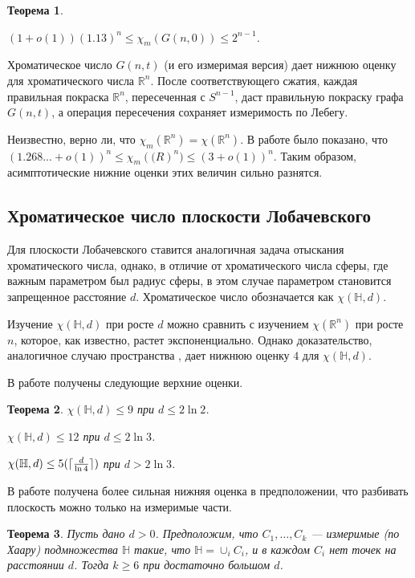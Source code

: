 \documentclass[a4paper,12pt]{article}
\DeclarePairedDelimiter\ceil{\lceil}{\rceil}
\newtheorem{theorem}{Теорема}
\begin{document}
 \begin{theorem} \label{12}

$(1+o(1))(1.13)^n \leq \chi_m(G(n,0)) \leq 2^{n-1} $.

\end{theorem}

Хроматическое число $G(n,t)$ (и его измеримая версия) дает нижнюю оценку для хроматического числа $\mathbb{R}^n$. После соответствующего сжатия, каждая правильная покраска $\mathbb{R}^n$, пересеченная с $S^{n-1}$, даст правильную покраску графа $G(n,t)$, а операция пересечения сохраняет измеримость по Лебегу.

Неизвестно, верно ли, что $\chi_m(\mathbb{R}^n) = \chi(\mathbb{R}^n)$. В работе \cite{Bach} было показано, что $(1.268... +o(1))^n \leq \chi_m(\mathbb(R)^n) \leq (3 + o(1))^n $. Таким образом, асимптотические нижние оценки этих величин сильно разнятся.

\subsection{Хроматическое число плоскости Лобачевского}
Для плоскости Лобачевского ставится аналогичная задача отыскания хроматического числа, однако, в отличие от хроматического числа сферы, где важным параметром был радиус сферы, в этом случае параметром становится запрещенное расстояние $d$. Хроматическое число обозначается как $\chi(\mathbb{H},d).$

Изучение $\chi(\mathbb{H},d)$ при росте $d$ можно сравнить с изучением $\chi(\mathbb{R}^n)$ при росте $n$, которое, как известно, растет экспоненциально. Однако доказательство, аналогичное случаю пространства \cite{Klo}, дает нижнюю оценку $4$ для $\chi(\mathbb{H},d)$.

В работе \cite{PP} получены следующие верхние оценки.
\begin{theorem}
$\chi(\mathbb{H},d) \leq 9$ при $d \leq 2 \ln{2}$.
 
$\chi(\mathbb{H},d) \leq 12$ при $d \leq 2 \ln{3}$.
  
$\chi(\mathbb{H},d) \leq 5(\ceil{\frac{d}{\ln{4}}})$ при $d > 2 \ln{3}$.
\end{theorem}

В работе \cite{CG} получена более сильная нижняя оценка в предположении, что разбивать плоскость можно только на измеримые части. 
\begin{theorem}
Пусть дано $d > 0$. Предположим, что $C_1, \dots, C_k$ --- измеримые (по Хаару) подмножества $\mathbb{H}$ такие, что $\mathbb{H} =  \cup_i C_i$, и в каждом $C_i$ нет точек на расстоянии $d$. Тогда $k \geq 6$ при достаточно большом $d$.
\end{theorem}
\end{document}
